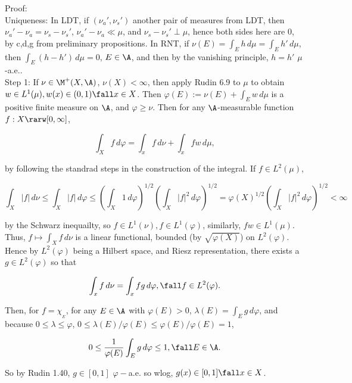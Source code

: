 \vspace{10pt}


\noindent
Proof: \\

\noindent
Uniqueness: In LDT, if $(\nu_a', \nu_s')$ another pair of measures from LDT, then $\nu_a' - \nu_a = \nu_s - \nu_s'$, $\nu_a' - \nu_a \ll \mu$, and $\nu_s - \nu_s' \perp \mu$, hence both sides here are 0, by c,d,g from preliminary propositions. In RNT, if $ \nu(E) = \int_E h \, d\mu =  \int_E h' \, d\mu $, then $  \int_E (h - h') \, d\mu = 0$, $E \in \A$, and then by the vanishing principle, $h = h'$ $\mu$-a.e.. \\

\noindent
Step 1: If $\nu \in \M^+(X, \A)$,  $\nu(X) < \infty$, then apply Rudin 6.9 to $\mu$ to obtain $w \in L^1(\mu), w(x) \in (0,1) \fall x \in X$. Then $\varphi(E) := \nu(E) + \int_E w \, d\mu$ is a positive finite measure on $\A$, and $\varphi \ge \nu$. Then for any $\A$-measurable function $f:X \rarw [0, \infty]$,

$$
\int_X f \, d\varphi = \int_x f \, d\nu + \int_x f w \, d\mu,
$$

\noindent
by following the standrad steps in the construction of the integral. If $f \in L^2(\mu)$,


$$
\int_X |f| \, d\nu  \le  \int_X |f| \, d\varphi \le \left( \int_X 1 \, d\varphi \right)^{1/2} \left( \int_X |f|^2 \, d\varphi \right)^{1/2}   = \varphi(X)^{1/2} \left( \int_X |f|^2 \, d\varphi \right)^{1/2} < \infty
$$

\noindent
by the Schwarz inequailty, so $f \in L^1(\nu), f \in L^1(\varphi)$, similarly, $fw \in L^1(\mu)$. Thus, $f \mapsto \int_X f \, d\nu$ is a linear functional, bounded (by $\sqrt{\varphi(X)}$)  on $L^2(\varphi)$. Hence by $L^2(\varphi)$ being a Hilbert space, and Riesz representation, there exists a $g \in L^2(\varphi)$ so that

$$
\int_x f \, d\nu = \int_x fg \, d\varphi, \fall f \in L^2(\varphi).
$$


\noindent
Then, for $f = \chi_{_E}$, for any $E \in \A$ with $\varphi(E) > 0$, $\lambda(E) = \int_E g \, d\varphi$, and because $ 0 \le \lambda \le \varphi$, $ 0 \le \lambda(E) / \varphi(E) \le \varphi(E)  / \varphi(E) = 1$,

$$
0 \le \frac{1}{\varphi(E)} \int_E g \, d\varphi \le 1, \fall E \in \A.
$$

\noindent
So by Rudin 1.40, $g \in [0,1]$ $\varphi-$a.e. so wlog, $g(x) \in [0,1] \fall x \in X$. \\

